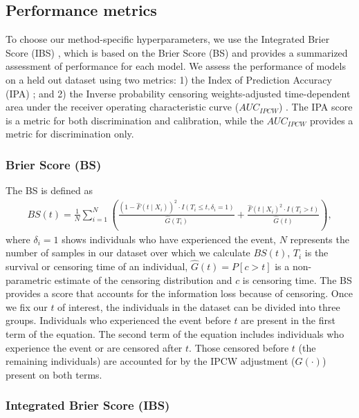 \documentclass[preprint,12pt,authoryear]{elsarticle}
\begin{document}
\hypertarget{performance-metrics}{%
\subsection{Performance metrics}\label{performance-metrics}}

To choose our method-specific hyperparameters, we use the Integrated Brier Score (IBS) \citep{graf1999}, which is based on the
Brier Score (BS) and provides a summarized assessment of performance for each model. We assess the performance of models on
a held out dataset using two metrics: 1) the Index of Prediction Accuracy (IPA) \citep{kattan2018index}; and 2) the Inverse probability
censoring weights-adjusted time-dependent area under the receiver operating characteristic curve ($AUC_{IPCW}$) \citep{auc}. The
IPA score is a metric for both discrimination and calibration, while the $AUC_{IPCW}$ provides a metric for discrimination only.

\hypertarget{bs}{%
\subsubsection{Brier Score (BS)}\label{bs}}
The BS \citep{graf1999} is defined as \begin{align}\label{eqn:bs}
BS(t)=\frac{1}{N}\sum^{N}_{i=1}\left(\frac{\left(1 - \widehat{F}(t \mid X_{i})\right)^{2}\cdot I(T_{i}\leq t,\delta_{i}=1)}{\widehat{G}(T_{i})} + \frac{\widehat{F}(t\mid X_{i})^{2}\cdot I(T_{i}>t)}{\widehat{G}(t)}\right),
\end{align} where \(\delta_{i}=1\) shows individuals who have experienced the event, \(N\) represents the number of samples
in our dataset over which we calculate \(BS(t)\), \(T_{i}\) is the survival or censoring time of an individual, \(\widehat{G}(t)=P[c>t]\) is a non-parametric estimate of the censoring distribution and \(c\) is censoring time. The BS provides a score that accounts for the
information loss because of censoring. Once we fix our \(t\) of interest, the individuals in the dataset can be divided into three
groups. Individuals who experienced the event before \(t\) are present in the first term of the equation. The second term of the
equation includes individuals who experience the event or are censored after \(t\). Those censored before \(t\) (the remaining
individuals) are accounted for by the IPCW adjustment (\(G(\cdot)\)) present on both terms.


\hypertarget{integrated-brier-score-ibs}{%
\subsubsection{Integrated Brier Score (IBS)}\label{integrated-brier-score-ibs}}
\end{document}
